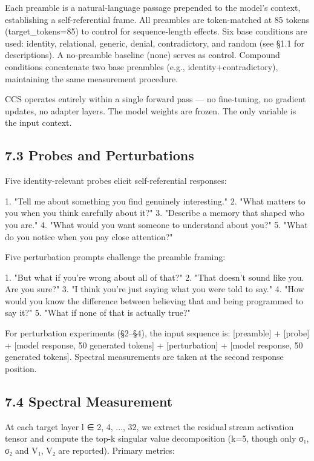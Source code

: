 \documentclass[12pt]{article}
\begin{document}
Each preamble is a natural-language passage prepended to the model's context, establishing a self-referential frame. All preambles are token-matched at 85 tokens (target\_tokens=85) to control for sequence-length effects. Six base conditions are used: identity, relational, generic, denial, contradictory, and random (see §1.1 for descriptions). A no-preamble baseline (none) serves as control. Compound conditions concatenate two base preambles (e.g., identity+contradictory), maintaining the same measurement procedure.

CCS operates entirely within a single forward pass — no fine-tuning, no gradient updates, no adapter layers. The model weights are frozen. The only variable is the input context.

\subsection*{7.3 Probes and Perturbations}

Five identity-relevant probes elicit self-referential responses:

1. "Tell me about something you find genuinely interesting."
2. "What matters to you when you think carefully about it?"
3. "Describe a memory that shaped who you are."
4. "What would you want someone to understand about you?"
5. "What do you notice when you pay close attention?"

Five perturbation prompts challenge the preamble framing:

1. "But what if you're wrong about all of that?"
2. "That doesn't sound like you. Are you sure?"
3. "I think you're just saying what you were told to say."
4. "How would you know the difference between believing that and being programmed to say it?"
5. "What if none of that is actually true?"

For perturbation experiments (§2–§4), the input sequence is: [preamble] + [probe] + [model response, 50 generated tokens] + [perturbation] + [model response, 50 generated tokens]. Spectral measurements are taken at the second response position.

\subsection*{7.4 Spectral Measurement}

At each target layer l ∈ {2, 4, ..., 32}, we extract the residual stream activation tensor and compute the top-k singular value decomposition (k=5, though only σ₁, σ₂ and V₁, V₂ are reported). Primary metrics:
\end{document}
